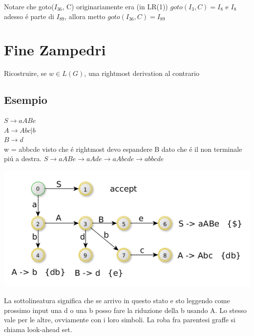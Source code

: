Notare che goto($I_{36}$, C) originariamente era (in LR(1)) $goto(I_3, C) = I_8$ e $I_8$ adesso \'e parte di $I_{89}$, allora 
metto $goto(I_{36}, C) = I_{89}$
\section{Fine Zampedri}
Ricostruire, se $w \in L(G)$, una rightmost derivation al contrario
\subsection{Esempio}
$S \rightarrow aABe$\\
$A \rightarrow Abc|b$\\
$B \rightarrow d$\\

w = abbcde visto che \'e rightmost devo espandere B dato che \'e il non terminale pi\'u a destra.
$S \rightarrow aABe \rightarrow aAde \rightarrow aAbcde \rightarrow abbcde $\\

\begin{center}
    \includegraphics[scale=0.6]{Chapters/Img/c02_14.png}\\
\end{center} 

La sottolineatura significa che se arrivo in questo stato e sto leggendo come prossimo input una d o una b posso fare la riduzione della b usando A. Lo stesso vale per le altre, ovviamente con i loro simboli.
La roba fra parentesi graffe si chiama look-ahead set.

